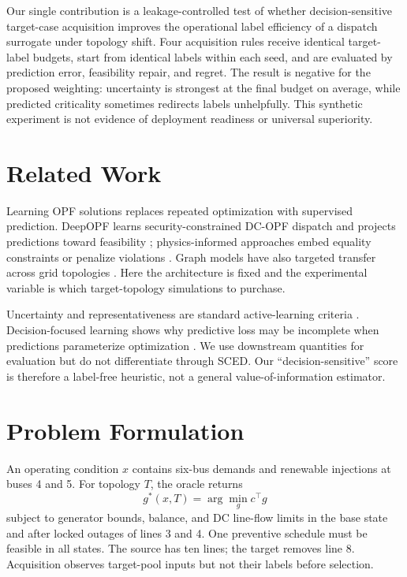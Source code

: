 \documentclass[11pt]{article}
\begin{document}
Our single contribution is a leakage-controlled test of whether decision-sensitive target-case acquisition improves the operational label efficiency of a dispatch surrogate under topology shift. Four acquisition rules receive identical target-label budgets, start from identical labels within each seed, and are evaluated by prediction error, feasibility repair, and regret. The result is negative for the proposed weighting: uncertainty is strongest at the final budget on average, while predicted criticality sometimes redirects labels unhelpfully. This synthetic experiment is not evidence of deployment readiness or universal superiority.

\section{Related Work}
Learning OPF solutions replaces repeated optimization with supervised prediction. DeepOPF learns security-constrained DC-OPF dispatch and projects predictions toward feasibility \cite{pan2021deepopf}; physics-informed approaches embed equality constraints or penalize violations \cite{fioretto2020predicting}. Graph models have also targeted transfer across grid topologies \cite{piloto2024canos}. Here the architecture is fixed and the experimental variable is which target-topology simulations to purchase.

Uncertainty and representativeness are standard active-learning criteria \cite{settles2009active}. Decision-focused learning shows why predictive loss may be incomplete when predictions parameterize optimization \cite{wilder2019melding,mandi2022decision}. We use downstream quantities for evaluation but do not differentiate through SCED. Our ``decision-sensitive'' score is therefore a label-free heuristic, not a general value-of-information estimator.

\section{Problem Formulation}
An operating condition $x$ contains six-bus demands and renewable injections at buses 4 and 5. For topology $T$, the oracle returns
\begin{equation}g^*(x,T)=\arg\min_g c^\top g\end{equation}
subject to generator bounds, balance, and DC line-flow limits in the base state and after locked outages of lines 3 and 4. One preventive schedule must be feasible in all states. The source has ten lines; the target removes line 8. Acquisition observes target-pool inputs but not their labels before selection.
\end{document}
